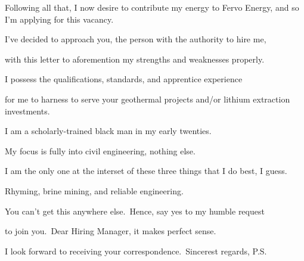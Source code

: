 Following all that, I now desire to contribute my energy to Fervo Energy, and so I'm applying for this vacancy.

I've decided to approach you, the person with the authority to hire me,

with this letter to aforemention my strengths and weaknesses properly.

I possess the qualifications, standards, and apprentice experience

for me to harness to serve your geothermal projects and/or lithium extraction investments.

I am a scholarly-trained black man in my early twenties.

My focus is fully into civil engineering, nothing else.

I am the only one at the interset of these three things that I do best, I guess.

Rhyming, brine mining, and reliable engineering.

You can't get this anywhere else.\ Hence, say yes to my humble request

to join you.\ Dear Hiring Manager, it makes perfect sense.

I look forward to receiving your correspondence.\ Sincerest regards, P.S.

\Large